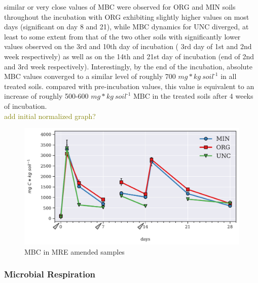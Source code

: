 \documentclass[12pt]{report}
\newcommand{\myGreen}[1]{\textcolor{olive}{#1}} %
\newlength{\SpaceAfterUnit}
\newcommand{\genericunit}{$ mg * kg\ soil^{\text{-}1}$ \hspace*{\SpaceAfterUnit}}
\begin{document}
		similar or very close values of MBC were observed for ORG and MIN soils throughout the incubation with ORG exhibiting slightly higher values on most days (significant on day 8 and 21), while MBC dynamics for UNC diverged, at least to some extent from that of the two other soils with significantly lower values observed on the 3rd and 10th day of incubation ( 3rd day of 1st and 2nd week respectively) as well as on the 14th and 21st day of incubation (end of 2nd and 3rd week respectively). Interestingly, by the end of the incubation, absolute MBC values converged to a similar level of roughly 700 \genericunit in all treated soils. compared with pre-incubation values, this value is equivalent to an increase of  roughly 500-600 \genericunit MBC in the treated soils after 4 weeks of incubation.\\
		 \myGreen{add initial normalized graph?}
		
		\begin{figure}[H]
			\centering
			\includegraphics[scale=0.8]{thesis_figures/main_incubation/MRE_treated/MBC.pdf}
			\caption{MBC in MRE amended samples}
			\label{fig:mbc_treated_main}
		\end{figure}
		
		
		
	\subsubsection{Microbial Respiration}
\end{document}
